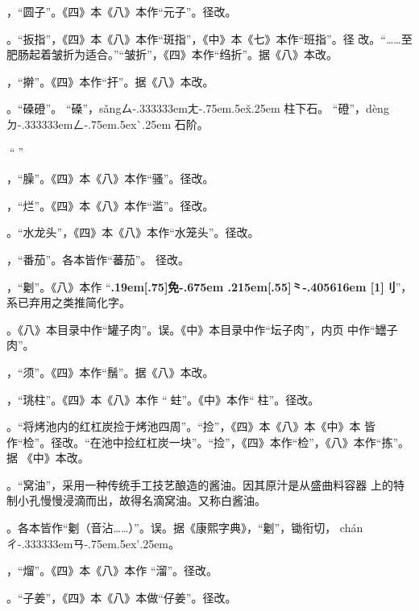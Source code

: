 ，“圆子”。《四》本《八》本作“元子”。径改。

。“扳指”，《四》本《八》本作“斑指”，《中》本《七》本作“班指”。径
改。“……至肥肠起着皱折为适合。”“皱折”，《四》本作“绉折”。据《八》本改。

，“擀”。《四》本作“扞”。据《八》本改。

。“磉磴”。
“磉”，{s\v{a}ng}{ㄙ\kern-.333333emㄤ\kern-.75em\raise.5ex\hbox{\v{}}\kern.25em}
柱下石。
“磴”，{d\`{e}ng}{ㄉ\kern-.333333emㄥ\kern-.75em\raise.5ex\hbox{\`{}}\kern.25em}
石阶。

，“𠟤”。疑误。

，“臊”。《四》本《八》本作“骚”。径改。

，“烂”。《四》本《八》本作“滥”。径改。

。“水龙头”，《四》本《八》本作“水笼头”。径改。

，“番茄”。各本皆作“蕃茄”。
径改。

，“劖”。《八》本作
“{\bfseries\raise.19em\hbox{\scalebox{.675}[.75]{免}}\kern-.675em%
\lower.215em\hbox{\scalebox{.95}[.55]{⺀}}\kern-.405616em%
\scalebox{.65}[1]{刂}}”，系已弃用之类推简化字。

。《八》本目录中作“罐子肉”。误。《中》本目录中作“坛子肉”，内页
中作“罎子肉”。

，“须”。《四》本作“鬚”。据《八》本改。

，“珧柱”。《四》本《八》本作
“𧎼蛀”。《中》本作“𧎼柱”。径改。

。“将烤池内的红杠炭捡于烤池四周”。“捡”，《四》本《八》本《中》本
皆作“检”。径改。“在池中捡红杠炭一块”。“捡”，《四》本作“检”，《八》本作“拣”。据
《中》本改。

。“窝油”，采用一种传统手工技艺酿造的酱油。因其原汁是从盛曲料容器
上的特制小孔慢慢浸滴而出，故得名滴窝油。又称白酱油。

。各本皆作“劖（音沾……）”。误。据《康熙字典》，“劖”，锄衔切，
{ch\'{a}n}{ㄔ\kern-.333333emㄢ\kern-.75em\raise.5ex\hbox{\'{}}\kern.25em}。

，“熘”。《四》本《八》本作
“溜”。径改。

。“子姜”，《四》本《八》本做“仔姜”。径改。

